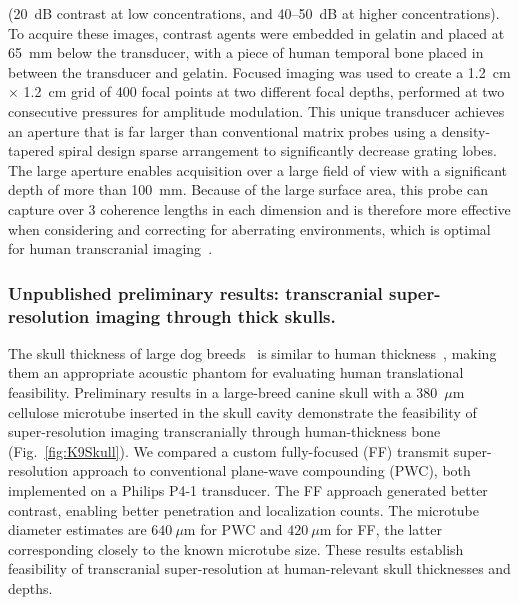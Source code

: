 (20~dB contrast at low concentrations, and 40--50~dB at higher concentrations). To acquire these images, contrast agents were embedded in gelatin and placed at 65~mm below the transducer, with a piece of human temporal bone placed in between the transducer and gelatin. Focused imaging was used to create a 1.2~cm $\times$ 1.2~cm grid of 400 focal points at two different focal depths, performed at two consecutive pressures for amplitude modulation. This unique transducer achieves an aperture that is far larger than conventional matrix probes using a density-tapered spiral design sparse arrangement to significantly decrease grating lobes. The large aperture enables acquisition over a large field of view with a significant depth of more than 100~mm. Because of the large surface area, this probe can capture over 3 coherence lengths in each dimension and is therefore more effective when considering and correcting for aberrating environments, which is optimal for human transcranial imaging~\cite{mccall2023development}.

\subsubsection{Unpublished preliminary results: transcranial super-resolution imaging through thick skulls.}
The skull thickness of large dog breeds~\cite{o2017investigation} is similar to human thickness~\cite{o2017investigation,de2016human,lynnerup2005thickness}, making them an appropriate acoustic phantom for evaluating human translational feasibility. Preliminary results in a large-breed canine skull with a 380~$\mu$m cellulose microtube inserted in the skull cavity demonstrate the feasibility of super-resolution imaging transcranially through human-thickness bone (Fig.~\ref{fig:K9Skull}). We compared a custom fully-focused (FF) transmit super-resolution approach to conventional plane-wave compounding (PWC), both implemented on a Philips P4-1 transducer. The FF approach generated better contrast, enabling better penetration and localization counts. The microtube diameter estimates are $640~\mu$m for PWC and $420~\mu$m for FF, the latter corresponding closely to the known microtube size. These results establish feasibility of transcranial super-resolution at human-relevant skull thicknesses and depths.

